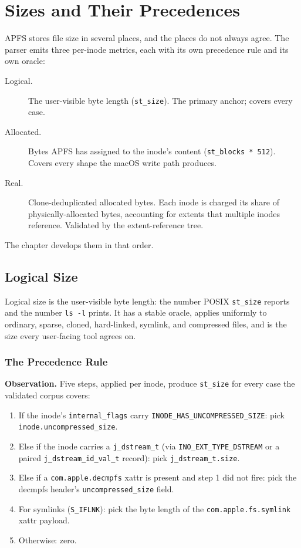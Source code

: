 \chapter{Sizes and Their Precedences}

APFS stores file size in several places, and the places do not
always agree. The parser emits three per-inode metrics, each with
its own precedence rule and its own oracle:

\begin{description}
  \item[Logical.] The user-visible byte length (\texttt{st\_size}).
    The primary anchor; covers every case.
  \item[Allocated.] Bytes APFS has assigned to the inode's content
    (\texttt{st\_blocks * 512}). Covers every shape the macOS
    write path produces.
  \item[Real.] Clone-deduplicated allocated bytes. Each inode is
    charged its share of physically-allocated bytes, accounting for
    extents that multiple inodes reference. Validated by the
    extent-reference tree.
\end{description}

The chapter develops them in that order.

\section{Logical Size}

Logical size is the user-visible byte length: the number POSIX
\texttt{st\_size} reports and the number \texttt{ls -l} prints. It
has a stable oracle, applies uniformly to ordinary, sparse, cloned,
hard-linked, symlink, and compressed files, and is the size every
user-facing tool agrees on.

\subsection{The Precedence Rule}

\textbf{Observation.} Five steps, applied per inode, produce
\texttt{st\_size} for every case the validated corpus covers:

\begin{enumerate}
  \item If the inode's \texttt{internal\_flags} carry
    \texttt{INODE\_HAS\_UNCOMPRESSED\_SIZE}: pick
    \texttt{inode.uncompressed\_size}.
  \item Else if the inode carries a \texttt{j\_dstream\_t} (via
    \texttt{INO\_EXT\_TYPE\_DSTREAM} or a paired
    \texttt{j\_dstream\_id\_val\_t} record): pick
    \texttt{j\_dstream\_t.size}.
  \item Else if a \texttt{com.apple.decmpfs} xattr is present and
    step 1 did not fire: pick the decmpfs header's
    \texttt{uncompressed\_size} field.
  \item For symlinks (\texttt{S\_IFLNK}): pick the byte length of the
    \texttt{com.apple.fs.symlink} xattr payload.
  \item Otherwise: zero.
\end{enumerate}

